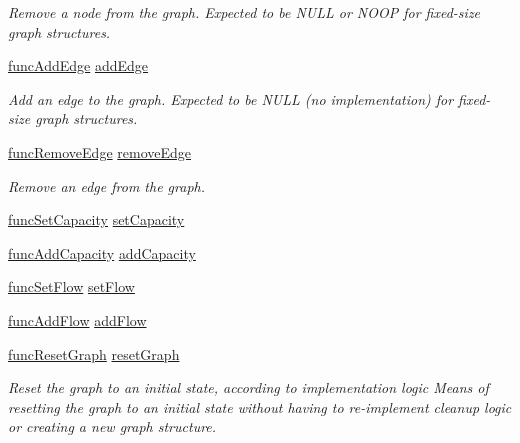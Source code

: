 \begin{DoxyCompactItemize}
\begin{DoxyCompactList}\small\item\em Remove a node from the graph. Expected to be N\+U\+LL or N\+O\+OP for fixed-\/size graph structures. \end{DoxyCompactList}\item 
\hyperlink{graphops_8h_aba7336fb04b988fb797cbcd8c9207d64}{func\+Add\+Edge} \hyperlink{structgraphops__t_af9a74b6643b49f7799dfa78f4824aa22}{add\+Edge}
\begin{DoxyCompactList}\small\item\em Add an edge to the graph. Expected to be N\+U\+LL (no implementation) for fixed-\/size graph structures. \end{DoxyCompactList}\item 
\hyperlink{graphops_8h_add68b0e594df34b6e201605a3757b78b}{func\+Remove\+Edge} \hyperlink{structgraphops__t_a330cbf9dbf71b84a47ab7ac8a11d71fa}{remove\+Edge}
\begin{DoxyCompactList}\small\item\em Remove an edge from the graph. \end{DoxyCompactList}\item 
\hyperlink{graphops_8h_aafd2cceeca9e12b071826c74ce049e7b}{func\+Set\+Capacity} \hyperlink{structgraphops__t_a6f05f8daf75bc380988e20e019681c0a}{set\+Capacity}
\item 
\hyperlink{graphops_8h_a55fd1e1994412d16611818d876b2488e}{func\+Add\+Capacity} \hyperlink{structgraphops__t_aafe9596d5e7ae4ba579213c1f0c789c7}{add\+Capacity}
\item 
\hyperlink{graphops_8h_a69ba36f21492df6ab16e426fffcf0c47}{func\+Set\+Flow} \hyperlink{structgraphops__t_ad62e88e4ea9ffdae0c3fb681433e3d92}{set\+Flow}
\item 
\hyperlink{graphops_8h_a595d28f6e4e3cef8d9549139dd40af53}{func\+Add\+Flow} \hyperlink{structgraphops__t_ae412853235d06cde6a63257a5fc172e1}{add\+Flow}
\item 
\hyperlink{graphops_8h_afbe0356f92d2a45740225f068371f4bc}{func\+Reset\+Graph} \hyperlink{structgraphops__t_a5e4e69eeeb8e25607c3af5dfcdbb88aa}{reset\+Graph}
\begin{DoxyCompactList}\small\item\em Reset the graph to an initial state, according to implementation logic Means of resetting the graph to an initial state without having to re-\/implement cleanup logic or creating a new graph structure. \end{DoxyCompactList}\end{DoxyCompactItemize}


